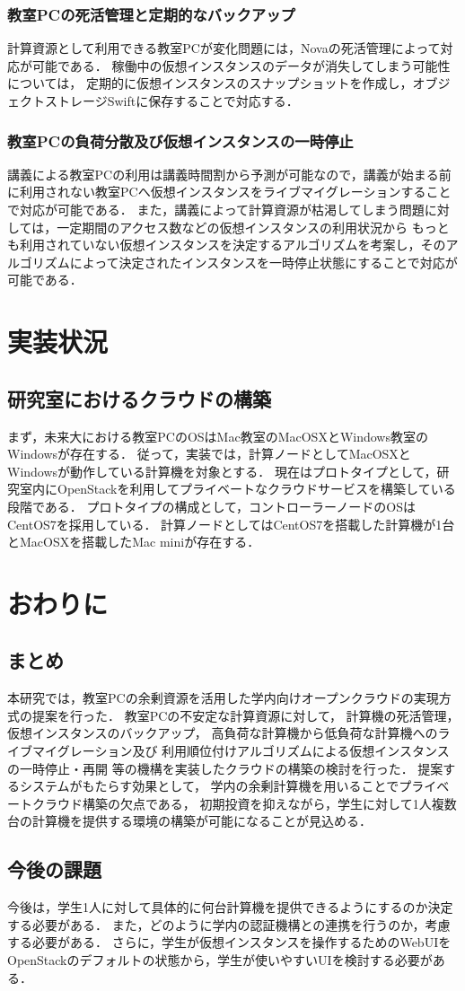 \documentclass[11pt,a4paper]{jsarticle}
\begin{document}
\subsubsection{教室PCの死活管理と定期的なバックアップ}
計算資源として利用できる教室PCが変化問題には，Novaの死活管理によって対応が可能である．
稼働中の仮想インスタンスのデータが消失してしまう可能性については，
定期的に仮想インスタンスのスナップショットを作成し，オブジェクトストレージSwiftに保存することで対応する．
\subsubsection{教室PCの負荷分散及び仮想インスタンスの一時停止}
講義による教室PCの利用は講義時間割から予測が可能なので，講義が始まる前に利用されない教室PCへ仮想インスタンスをライブマイグレーションすることで対応が可能である．
また，講義によって計算資源が枯渇してしまう問題に対しては，一定期間のアクセス数などの仮想インスタンスの利用状況から
もっとも利用されていない仮想インスタンスを決定するアルゴリズムを考案し，そのアルゴリズムによって決定されたインスタンスを一時停止状態にすることで対応が可能である．

\section{実装状況}
\subsection{研究室におけるクラウドの構築}
まず，未来大における教室PCのOSはMac教室のMacOSXとWindows教室のWindowsが存在する．
従って，実装では，計算ノードとしてMacOSXとWindowsが動作している計算機を対象とする．
現在はプロトタイプとして，研究室内にOpenStackを利用してプライベートなクラウドサービスを構築している段階である．
プロトタイプの構成として，コントローラーノードのOSはCentOS7を採用している．
計算ノードとしてはCentOS7を搭載した計算機が1台とMacOSXを搭載したMac miniが存在する．

\section{おわりに}
\subsection{まとめ}
本研究では，教室PCの余剰資源を活用した学内向けオープンクラウドの実現方式の提案を行った．
教室PCの不安定な計算資源に対して，
計算機の死活管理，仮想インスタンスのバックアップ，
高負荷な計算機から低負荷な計算機へのライブマイグレーション及び
利用順位付けアルゴリズムによる仮想インスタンスの一時停止・再開
等の機構を実装したクラウドの構築の検討を行った．
提案するシステムがもたらす効果として，
学内の余剰計算機を用いることでプライベートクラウド構築の欠点である，
初期投資を抑えながら，学生に対して1人複数台の計算機を提供する環境の構築が可能になることが見込める．
\subsection{今後の課題}
今後は，学生1人に対して具体的に何台計算機を提供できるようにするのか決定する必要がある．
また，どのように学内の認証機構との連携を行うのか，考慮する必要がある．
さらに，学生が仮想インスタンスを操作するためのWebUIをOpenStackのデフォルトの状態から，学生が使いやすいUIを検討する必要がある．


\end{document}
